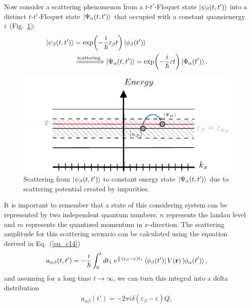 Now consider a scattering phenomenon from a $t$-$t'$-Floquet state $\ket{\psi_{\beta}(t,t')} $ into a distinct $t$-$t'$-Floquet state $\ket{\Psi_{\alpha}(t,t')}$ that occupied with a constant quansienergy $\varepsilon$ (Fig.~\ref{fig_2}):
\begin{equation} \label{eq_c15}
  \begin{aligned}
  \ket{\psi_{\beta}(t,t')} &= \exp(-\frac{i}{\hbar}\varepsilon_{\beta} t)
  \ket{\phi_{\beta}(t')} \\
  &
  \xRightarrow{\text{scattering}}
  \ket{\Psi_{\alpha}(t,t')} = \exp(-\frac{i}{\hbar}\varepsilon t)
  \ket{\Phi_{\alpha}(t')}.
  \end{aligned}
\end{equation}
\begin{figure}[b]
  \includegraphics[scale=1.0]{figures/fig_2.pdf}
  \caption{Scattering from $\ket{\psi_{\beta}(t,t')}$ to constant energy state $\ket{\Psi_{\alpha}(t,t')}$ due to scattering potential created by impurities.}
  \label{fig_2}
\end{figure}
It is important to remember that a state of this considering system can be represented by two independent quantum numbers: $n$ represents the landau level and $m$ represents the quantized momentum in $x$-direction. The scattering amplitude for this scattering scenario can be calculated using the equation derived in Eq.~(\ref{eq_c14})
\begin{equation} \label{eq_c16}
  \begin{aligned}
    a_{\alpha\beta}(t,t') =
    -\frac{i}{\hbar}
    \int_{0}^t dt_1 \;
    e^{\frac{i}{\hbar}\qty(\varepsilon_{\beta} - \varepsilon)t_1}
    \bra{\phi_{\beta}(t')}
    V(\vb{r}) \ket{\phi_{\alpha}(t')},
  \end{aligned}
\end{equation}
and assuming for a long time $t \rightarrow \infty$, we can turn this integral into a delta distribution
\begin{equation} \label{eq_c17}
  \begin{aligned}
    a_{\alpha\beta}(t') =
    -2\pi i \delta(\varepsilon_{\beta} - \varepsilon)Q,
  \end{aligned}
\end{equation}
